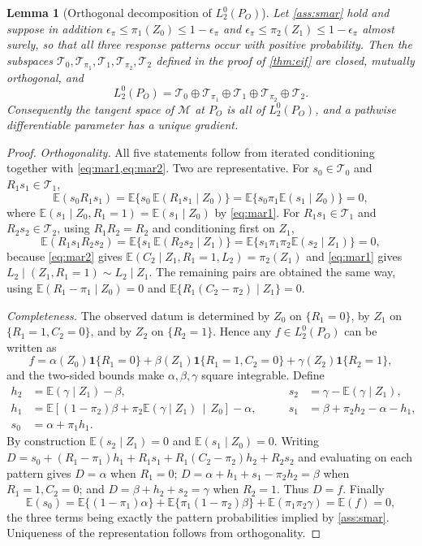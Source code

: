 \documentclass[11pt]{article}
\newtheorem{lemma}{Lemma}
\theoremstyle{definition}
\newcommand{\E}{\mathbb{E}}
\newcommand{\1}{\mathbf{1}}
\begin{document}
\begin{lemma}[Orthogonal decomposition of $L_2^0(P_O)$]\label{lem:tangent}
Let \cref{ass:smar} hold and suppose in addition
$\epsilon_\pi\le\pi_1(Z_0)\le1-\epsilon_\pi$ and
$\epsilon_\pi\le\pi_2(Z_1)\le1-\epsilon_\pi$ almost surely, so that all three
response patterns occur with positive probability. Then the subspaces
$\mathcal T_0,\mathcal T_{\pi_1},\mathcal T_1,\mathcal T_{\pi_2},\mathcal T_2$
defined in the proof of \cref{thm:eif} are closed, mutually orthogonal, and
\[
L_2^0(P_O)=\mathcal T_0\oplus\mathcal T_{\pi_1}\oplus\mathcal T_1
\oplus\mathcal T_{\pi_2}\oplus\mathcal T_2 .
\]
Consequently the tangent space of $\mathcal M$ at $P_O$ is all of $L_2^0(P_O)$,
and a pathwise differentiable parameter has a unique gradient.
\end{lemma}

\begin{proof}
\emph{Orthogonality.} All five statements follow from iterated conditioning
together with \cref{eq:mar1,eq:mar2}. Two are representative. For
$s_0\in\mathcal T_0$ and $R_1s_1\in\mathcal T_1$,
\[
\E(s_0R_1s_1)=\E\{s_0\,\E(R_1s_1\mid Z_0)\}
=\E\{s_0\pi_1\E(s_1\mid Z_0)\}=0,
\]
where $\E(s_1\mid Z_0,R_1=1)=\E(s_1\mid Z_0)$ by \cref{eq:mar1}. For
$R_1s_1\in\mathcal T_1$ and $R_2s_2\in\mathcal T_2$, using $R_1R_2=R_2$ and
conditioning first on $Z_1$,
\[
\E(R_1s_1R_2s_2)=\E\{s_1\,\E(R_2s_2\mid Z_1)\}
=\E\{s_1\pi_1\pi_2\E(s_2\mid Z_1)\}=0,
\]
because \cref{eq:mar2} gives $\E(C_2\mid Z_1,R_1=1,L_2)=\pi_2(Z_1)$ and
\cref{eq:mar1} gives $L_2\mid(Z_1,R_1=1)\sim L_2\mid Z_1$. The remaining pairs
are obtained the same way, using $\E(R_1-\pi_1\mid Z_0)=0$ and
$\E\{R_1(C_2-\pi_2)\mid Z_1\}=0$.

\emph{Completeness.} The observed datum is determined by $Z_0$ on $\{R_1=0\}$,
by $Z_1$ on $\{R_1=1,C_2=0\}$, and by $Z_2$ on $\{R_2=1\}$. Hence any
$f\in L_2^0(P_O)$ can be written as
\[
f=\alpha(Z_0)\1\{R_1=0\}+\beta(Z_1)\1\{R_1=1,C_2=0\}+\gamma(Z_2)\1\{R_2=1\},
\]
and the two-sided bounds make $\alpha,\beta,\gamma$ square integrable. Define
\begin{align*}
h_2&=\E(\gamma\mid Z_1)-\beta, &\qquad s_2&=\gamma-\E(\gamma\mid Z_1),\\
h_1&=\E\!\left[(1-\pi_2)\beta+\pi_2\E(\gamma\mid Z_1)\,\middle|\,Z_0\right]-\alpha,
&\qquad s_1&=\beta+\pi_2h_2-\alpha-h_1,\\
s_0&=\alpha+\pi_1h_1.
\end{align*}
By construction $\E(s_2\mid Z_1)=0$ and $\E(s_1\mid Z_0)=0$. Writing
$D=s_0+(R_1-\pi_1)h_1+R_1s_1+R_1(C_2-\pi_2)h_2+R_2s_2$ and evaluating on each
pattern gives $D=\alpha$ when $R_1=0$; $D=\alpha+h_1+s_1-\pi_2h_2=\beta$ when
$R_1=1,C_2=0$; and $D=\beta+h_2+s_2=\gamma$ when $R_2=1$. Thus $D=f$. Finally
\[
\E(s_0)=\E\{(1-\pi_1)\alpha\}+\E\{\pi_1(1-\pi_2)\beta\}+\E(\pi_1\pi_2\gamma)=\E(f)=0,
\]
the three terms being exactly the pattern probabilities implied by
\cref{ass:smar}. Uniqueness of the representation follows from orthogonality.
\end{proof}
\end{document}

